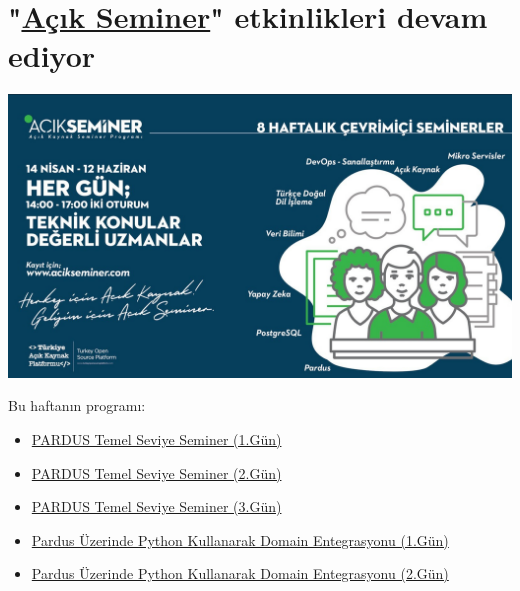 \documentclass[11pt]{article}
\begin{document}
\section{"\href{https://www.acikseminer.com/}{Açık Seminer}" etkinlikleri devam ediyor}
\label{sec:orgf34b5ae}
\begin{center}
\includegraphics[width=.9\linewidth]{gorseller/acik-seminer.jpeg}
\end{center}

Bu haftanın programı:
\begin{itemize}
\item \href{https://www.acikseminer.com/seminerler/pardus-temel-seviye-seminer-1gun-08f34754}{PARDUS Temel Seviye Seminer (1.Gün)}
\item \href{https://www.acikseminer.com/seminerler/pardus-temel-seviye-seminer-2gun-6f1799a0}{PARDUS Temel Seviye Seminer (2.Gün)}
\item \href{https://www.acikseminer.com/seminerler/pardus-temel-seviye-seminer-3gun-bb5381e0}{PARDUS Temel Seviye Seminer (3.Gün)}
\item \href{https://www.acikseminer.com/seminerler/pardus-uzerinde-python-kullanarak-domain-entegrasyonu-1gun-b62a1c6f}{Pardus Üzerinde Python Kullanarak Domain Entegrasyonu (1.Gün)}
\item \href{https://www.acikseminer.com/seminerler/pardus-uzerinde-python-kullanarak-domain-entegrasyonu-2gun-728376ec}{Pardus Üzerinde Python Kullanarak Domain Entegrasyonu (2.Gün)}
\end{itemize}
\end{document}
